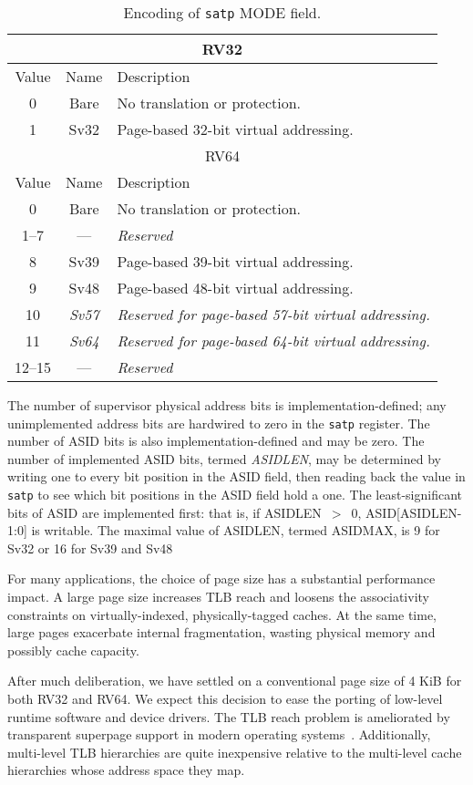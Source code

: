 \begin{table}[h]
\begin{center}
\begin{tabular}{|c|c|l|}
\hline
\multicolumn{3}{|c|}{RV32} \\
\hline
Value  & Name & Description \\
\hline
0       & Bare  & No translation or protection. \\
1       & Sv32  & Page-based 32-bit virtual addressing. \\
\hline \hline
\multicolumn{3}{|c|}{RV64} \\
\hline
Value  & Name & Description \\
\hline  
0       & Bare  & No translation or protection. \\
1--7    & ---   & {\em Reserved} \\
8       & Sv39  & Page-based 39-bit virtual addressing. \\
9       & Sv48  & Page-based 48-bit virtual addressing. \\
10      & {\em Sv57} & {\em Reserved for page-based 57-bit virtual addressing.} \\
11      & {\em Sv64} & {\em Reserved for page-based 64-bit virtual addressing.} \\
12--15  & ---   & {\em Reserved} \\
\hline
\end{tabular}
\end{center}
\caption{Encoding of {\tt satp} MODE field.}
\label{tab:satp-mode}
\end{table}

The number of supervisor physical address bits is implementation-defined; any
unimplemented address bits are hardwired to zero in the {\tt satp} register.
The number of ASID bits is also implementation-defined and may be zero.  The
number of implemented ASID bits, termed {\mbox {\em ASIDLEN}}, may be
determined by writing one to every bit position in the ASID field, then
reading back the value in {\tt satp} to see which bit positions in the ASID
field hold a one.  The least-significant bits of ASID are implemented first:
that is, if ASIDLEN~$>$~0, ASID[ASIDLEN-1:0] is writable.  The maximal value
of ASIDLEN, termed ASIDMAX, is 9 for Sv32 or 16 for Sv39 and Sv48


\begin{commentary}
For many applications, the choice of page size has a substantial
performance impact.  A large page size increases TLB reach and loosens
the associativity constraints on virtually-indexed, physically-tagged
caches.  At the same time, large pages exacerbate internal
fragmentation, wasting physical memory and possibly cache capacity.

After much deliberation, we have settled on a conventional page size
of 4 KiB for both RV32 and RV64.  We expect this decision to ease the
porting of low-level runtime software and device drivers.  The TLB
reach problem is ameliorated by transparent superpage support in
modern operating systems~\cite{transparent-superpages}.  Additionally,
multi-level TLB hierarchies are quite inexpensive relative to the
multi-level cache hierarchies whose address space they map.
\end{commentary}

